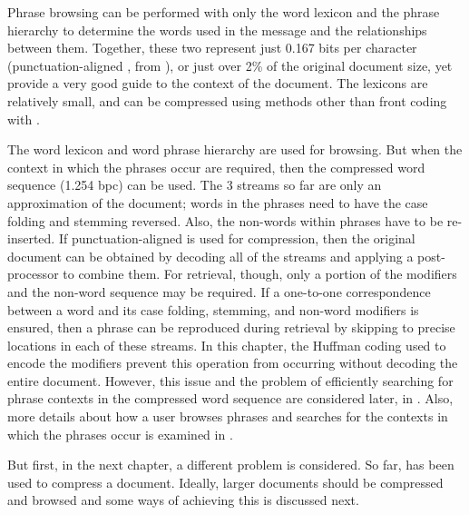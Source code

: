 Phrase browsing can be
performed with only the word lexicon and the 
phrase hierarchy to determine the words used in
the message and the relationships between them.
Together, these two represent just 
0.167 bits per character (punctuation-aligned 
\repair, from ), or just
over 2\% of the original document size, yet provide a very
good guide to the context of the document. 
The lexicons are relatively small, and can be compressed
using methods other than front coding with \bzip.

The word lexicon and word phrase hierarchy are used
for browsing.  But when the context in which the phrases
occur are
required, then the compressed word sequence (1.254 bpc) 
can be used.  The 3 streams so far are only an 
approximation of the document;
words in the phrases need to have the case folding and
stemming reversed.  Also, the non-words within 
phrases have to be re-inserted.  If punctuation-aligned
\repair is used for compression, then the original
document can be obtained by decoding all of the streams
and applying a post-processor to combine them.  For
retrieval, though, only a portion of the modifiers 
and the non-word sequence may be required.  If a 
one-to-one correspondence
between a word and its case folding, stemming, 
and non-word modifiers is ensured, then
a phrase can be reproduced during retrieval
by skipping to precise locations in each of these streams.
In this chapter, the Huffman coding used to encode the modifiers
prevent this operation from occurring 
without decoding the entire document.  However,
this issue and the problem of efficiently searching for
phrase contexts in the compressed word sequence are considered
later, in .  Also, more details about
how a user browses phrases and searches for the contexts
in which the phrases occur is examined in 
.

But first, in the next chapter, a different problem 
is considered.
So far, \repair has been used to compress a 
document.  Ideally, larger documents should be compressed
and browsed and some ways of achieving this is discussed
next.

